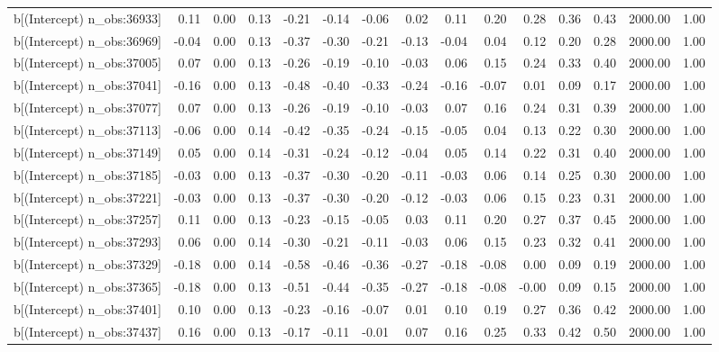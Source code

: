 \begin{table}[ht]
\begin{tabular}{rrrrrrrrrrrrrrr}
  b[(Intercept) n\_obs:36933] & 0.11 & 0.00 & 0.13 & -0.21 & -0.14 & -0.06 & 0.02 & 0.11 & 0.20 & 0.28 & 0.36 & 0.43 & 2000.00 & 1.00 \\ 
  b[(Intercept) n\_obs:36969] & -0.04 & 0.00 & 0.13 & -0.37 & -0.30 & -0.21 & -0.13 & -0.04 & 0.04 & 0.12 & 0.20 & 0.28 & 2000.00 & 1.00 \\ 
  b[(Intercept) n\_obs:37005] & 0.07 & 0.00 & 0.13 & -0.26 & -0.19 & -0.10 & -0.03 & 0.06 & 0.15 & 0.24 & 0.33 & 0.40 & 2000.00 & 1.00 \\ 
  b[(Intercept) n\_obs:37041] & -0.16 & 0.00 & 0.13 & -0.48 & -0.40 & -0.33 & -0.24 & -0.16 & -0.07 & 0.01 & 0.09 & 0.17 & 2000.00 & 1.00 \\ 
  b[(Intercept) n\_obs:37077] & 0.07 & 0.00 & 0.13 & -0.26 & -0.19 & -0.10 & -0.03 & 0.07 & 0.16 & 0.24 & 0.31 & 0.39 & 2000.00 & 1.00 \\ 
  b[(Intercept) n\_obs:37113] & -0.06 & 0.00 & 0.14 & -0.42 & -0.35 & -0.24 & -0.15 & -0.05 & 0.04 & 0.13 & 0.22 & 0.30 & 2000.00 & 1.00 \\ 
  b[(Intercept) n\_obs:37149] & 0.05 & 0.00 & 0.14 & -0.31 & -0.24 & -0.12 & -0.04 & 0.05 & 0.14 & 0.22 & 0.31 & 0.40 & 2000.00 & 1.00 \\ 
  b[(Intercept) n\_obs:37185] & -0.03 & 0.00 & 0.13 & -0.37 & -0.30 & -0.20 & -0.11 & -0.03 & 0.06 & 0.14 & 0.25 & 0.30 & 2000.00 & 1.00 \\ 
  b[(Intercept) n\_obs:37221] & -0.03 & 0.00 & 0.13 & -0.37 & -0.30 & -0.20 & -0.12 & -0.03 & 0.06 & 0.15 & 0.23 & 0.31 & 2000.00 & 1.00 \\ 
  b[(Intercept) n\_obs:37257] & 0.11 & 0.00 & 0.13 & -0.23 & -0.15 & -0.05 & 0.03 & 0.11 & 0.20 & 0.27 & 0.37 & 0.45 & 2000.00 & 1.00 \\ 
  b[(Intercept) n\_obs:37293] & 0.06 & 0.00 & 0.14 & -0.30 & -0.21 & -0.11 & -0.03 & 0.06 & 0.15 & 0.23 & 0.32 & 0.41 & 2000.00 & 1.00 \\ 
  b[(Intercept) n\_obs:37329] & -0.18 & 0.00 & 0.14 & -0.58 & -0.46 & -0.36 & -0.27 & -0.18 & -0.08 & 0.00 & 0.09 & 0.19 & 2000.00 & 1.00 \\ 
  b[(Intercept) n\_obs:37365] & -0.18 & 0.00 & 0.13 & -0.51 & -0.44 & -0.35 & -0.27 & -0.18 & -0.08 & -0.00 & 0.09 & 0.15 & 2000.00 & 1.00 \\ 
  b[(Intercept) n\_obs:37401] & 0.10 & 0.00 & 0.13 & -0.23 & -0.16 & -0.07 & 0.01 & 0.10 & 0.19 & 0.27 & 0.36 & 0.42 & 2000.00 & 1.00 \\ 
  b[(Intercept) n\_obs:37437] & 0.16 & 0.00 & 0.13 & -0.17 & -0.11 & -0.01 & 0.07 & 0.16 & 0.25 & 0.33 & 0.42 & 0.50 & 2000.00 & 1.00 \\ 

\end{tabular}
\end{table}
